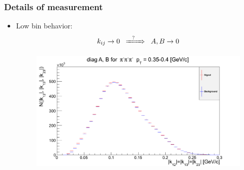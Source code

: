 \documentclass{beamer}
\begin{document}
\begin{frame}[noframenumbering]
\frametitle{Details of measurement}
\begin{itemize}
\setlength{\itemsep}{16pt}
\item Low bin behavior:
\begin{equation}
k_{ij}\rightarrow 0 \;\;\xRightarrow{\;\;\;?\;\;\;\;}\;\; A,B\rightarrow 0
\end{equation}
\begin{figure}
\includegraphics[scale=0.25]{pic/AB2}
\end{figure}
\end{itemize}
\end{frame}
\end{document}
